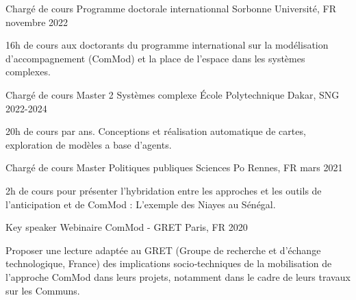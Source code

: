 

\begin{cventries}
  
  \cventry
    {Chargé de cours} %
    {Programme doctorale internationnal} %
    {Sorbonne Université, FR} %
    {novembre 2022} %
    {
      \begin{cvitems} %
        16h de cours aux doctorants du programme international sur la modélisation d'accompagnement (ComMod) et la place de l'espace dans les systèmes complexes. 
      \end{cvitems}
    }

  \cventry
    {Chargé de cours} %
    {Master 2 Systèmes complexe} %
    {\'Ecole Polytechnique Dakar, SNG} %
    {2022-2024} %
    {
      \begin{cvitems} %
      20h de cours par ans. Conceptions et réalisation automatique de cartes, exploration de modèles a base d'agents.
      \end{cvitems}
    }

  \cventry
    {Chargé de cours} %
    {Master Politiques publiques} %
    {Sciences Po Rennes, FR} %
    {mars 2021} %
    {
      \begin{cvitems} %
      2h de cours pour présenter l'hybridation entre les approches et les outils de l'anticipation et de ComMod : L'exemple des Niayes au Sénégal.
      \end{cvitems}
    }

      \cventry
        {Key speaker} %
        {Webinaire ComMod - GRET} %
        {Paris, FR} %
        {2020} %
        {
          \begin{cvitems} %
            Proposer une lecture adaptée au GRET (Groupe de recherche et d’échange technologique, France) des implications socio‑techniques de la mobilisation de l’approche ComMod dans leurs projets, notamment dans le cadre de leurs travaux sur les Communs.
          \end{cvitems}
        }
        

\end{cventries}
